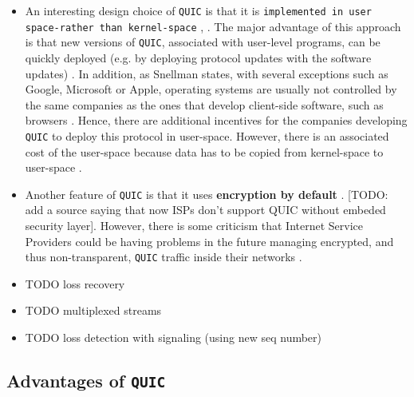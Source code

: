 \documentclass[12pt,a4paper,twoside,openright]{report}
\begin{document}
\begin{itemize}
 


  \item 
  An interesting design choice of \texttt{QUIC} is that it is  \texttt{implemented in user space-rather than kernel-space} \cite{the-road-to-quic}, \cite{Implementation_and_Performance_Evaluation_of_the_QUIC_Protocol_in_Linux_Kernel}.
  The major advantage of this approach is that new versions of \texttt{QUIC}, associated with user-level programs, can be quickly deployed (e.g. by deploying protocol updates with the software updates) \cite{the-road-to-quic}.
  In addition, as Snellman states, with several exceptions such as Google, Microsoft or Apple, operating systems are usually not controlled by the same companies as the ones that develop client-side software, such as browsers \cite{2016-12-01-quic-tou}.
  Hence, there are additional incentives for the companies developing \texttt{QUIC} to deploy this protocol in user-space.
  However, there is an associated cost of the user-space because data has to be copied from kernel-space to user-space \cite{benchmarking-quic}.
  
  
 
  \item Another feature of \texttt{QUIC} is that it uses \textbf{encryption by default} \cite{the-road-to-quic}.
  [TODO: add a source saying that now ISPs don't support QUIC without embeded security layer].
  However, there is some criticism that Internet Service Providers could be having problems in the future managing encrypted, and thus non-transparent, \texttt{QUIC} traffic inside their networks \cite{why-is-googles-quic-leaving-network-operators-in-the-dark}.
  
  

  
  \item TODO loss recovery
  
  \item TODO multiplexed streams
 
  \item TODO loss detection with signaling (using new seq number)
  
  
\end{itemize}


\subsection{Advantages of \texttt{QUIC}} \label{QUIC_advantages}
\end{document}
